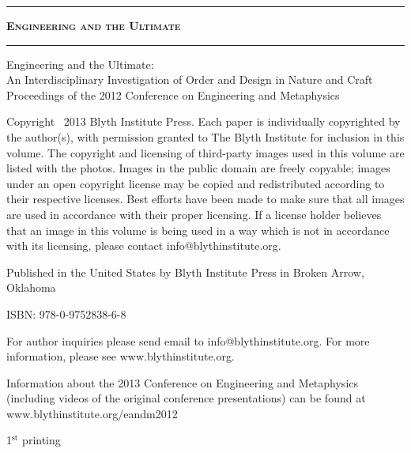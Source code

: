 \begin{titlepage}
\begingroup

\setlength{\parindent}{0cm}
\setlength{\parskip}{1em}

\vspace*{\fill}
\begin{center}
\hrule
{\LARGE \textsc{\textbf{Engineering and the Ultimate}}}
\baselineskip
\hrule
\end{center}
\vspace*{\fill}

\clearpage %

\thispagestyle{empty}
\vspace*{\fill}

{\small
Engineering and the Ultimate: \\ An Interdisciplinary Investigation of Order and Design in Nature and Craft \\ Proceedings of the 2012 Conference on Engineering and Metaphysics

Copyright \textcopyright\ 2013 Blyth Institute Press.  Each paper is individually copyrighted by the author(s), with permission granted to The Blyth Institute for inclusion in this volume.  The copyright and licensing of third-party images used in this volume are listed with the photos.  Images in the public domain are freely copyable; images under an open copyright license may be copied and redistributed according to their respective licenses.  Best efforts have been made to make sure that all images are used in accordance with their proper licensing.  If a license holder believes that an image in this volume is being used in a way which is not in accordance with its licensing, please contact info@blythinstitute.org.

Published in the United States by Blyth Institute Press in Broken Arrow, Oklahoma


ISBN: 978-0-9752838-6-8

For author inquiries please send email to info@blythinstitute.org.  For more information, please see www.blythinstitute.org.

Information about the 2013 Conference on Engineering and Metaphysics (including videos of the original conference presentations) can be found at www.blythinstitute.org/eandm2012

\baselineskip

1$^{\textrm{st}}$ printing}


\end{titlepage}
